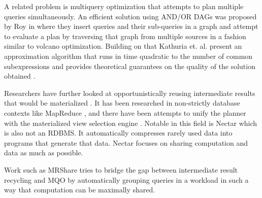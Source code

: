A related problem is multiquery optimization
\cite{theodoratosDataWarehouseConfiguration1997} that attempts to plan
multiple queries simultaneously. An efficient solution using AND/OR
DAGs was proposed by Roy in \cite{royEfficientExtensibleAlgorithms2000}
where they insert queries and their sub-queries in a graph and attempt
to evaluate a plan by traversing that graph from multiple sources in a
fashion similar to volcano optimization. Building on that Kathuria
et. al. present an approximation algorithm that runs in time
quadratic to the number of common subexpressions and provides
theoretical guarantees on the quality of the solution obtained
\cite{kathuriaEfficientProvableMultiquery2017}.

Researchers have further looked at opportunistically reusing
intermediate results that would be materialized
\cite{ivanovaArchitectureRecyclingIntermediates2010,nagelRecyclingPipelinedQuery2013}. It
has been researched in non-strictly database contexts like MapReduce
\cite{elghandourReStoreReusingResults2012a}, and there have been
attempts to unify the planner with the materialized view selection
engine \cite{perezHistoryawareQueryOptimization2014a}. Notable in this
field is Nectar \cite{gundaNectarAutomaticManagement2010} which is also
not an RDBMS. It automatically compresses rarely used data into
programs that generate that data. Nectar focuses on sharing
computation and data as much as possible.

Work such as MRShare \cite{nykielMRShareSharingMultiple2010} tries to
bridge the gap between intermediate result recycling and MQO by
automatically grouping queries in a workload in such a way that
computation can be maximally shared.
